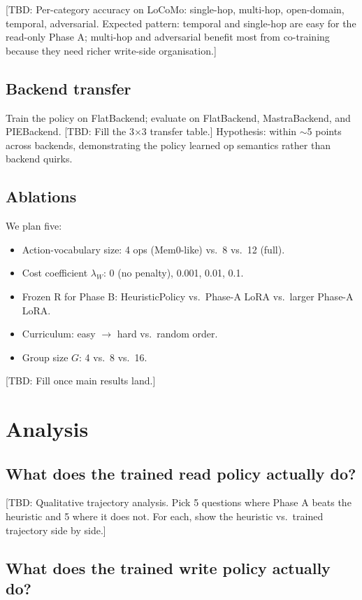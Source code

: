 \documentclass[11pt]{article}
\newcommand{\TBD}[1]{%
  \textcolor{red!80!black}{\textsf{[TBD: #1]}}}
\begin{document}
\TBD{Per-category accuracy on LoCoMo: single-hop, multi-hop, open-domain,
temporal, adversarial. Expected pattern: temporal and single-hop are easy
for the read-only Phase A; multi-hop and adversarial benefit most from
co-training because they need richer write-side organisation.}

\subsection{Backend transfer}

Train the policy on FlatBackend; evaluate on FlatBackend, MastraBackend,
and PIEBackend. \TBD{Fill the 3$\times$3 transfer table.} Hypothesis:
within $\sim$5 points across backends, demonstrating the policy learned
op semantics rather than backend quirks.

\subsection{Ablations}

We plan five:
\begin{itemize}
  \item Action-vocabulary size: 4 ops (Mem0-like) vs.\ 8 vs.\ 12 (full).
  \item Cost coefficient $\lambda_W$: 0 (no penalty), 0.001, 0.01, 0.1.
  \item Frozen R for Phase B: HeuristicPolicy vs.\ Phase-A LoRA vs.\
    larger Phase-A LoRA.
  \item Curriculum: easy $\to$ hard vs.\ random order.
  \item Group size $G$: 4 vs.\ 8 vs.\ 16.
\end{itemize}
\TBD{Fill once main results land.}

\section{Analysis}

\subsection{What does the trained read policy actually do?}

\TBD{Qualitative trajectory analysis. Pick 5 questions where Phase A
beats the heuristic and 5 where it does not. For each, show the heuristic
vs.\ trained trajectory side by side.}

\subsection{What does the trained write policy actually do?}
\end{document}
